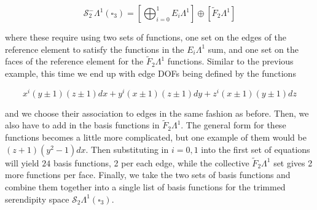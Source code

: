 \documentclass[manuscript,screen]{acmart}
\newcommand{\calS}{\mathcal{S}}
\begin{document}
\begin{equation}
   \calS^-_2\Lambda^1(\square_3) =    \left[\bigoplus_{i=0}^{1} E_i \Lambda^1\right] \oplus \left[\tilde{F}_2 \Lambda^1\right]
   \end{equation}
   
\noindent where these require using two sets of functions, one set on the edges of the reference element to satisfy the functions in the $E_i\Lambda^1$ sum, and one set on the faces of the reference element for the $\tilde{F}_2\Lambda^1$ functions. Similar to the previous example, this time we end up with edge DOFs being defined by the functions 

\begin{equation*}
    x^i(y\pm 1)(z\pm 1)dx + y^i(x\pm 1)(z\pm 1) dy + z^i(x \pm 1)(y \pm 1)dz
\end{equation*}

\noindent and we choose their association to edges in the same fashion as before.  Then, we also have to add in the basis functions in $\tilde{F}_2\Lambda^1$.  The general form for these functions becomes a little more complicated, but one example of them would be $(z+1)(y^2-1)dx$.  Then substituting in $i=0, 1$ into the first set of equations will yield $24$ basis functions, 2 per each edge, while the collective $\tilde{F}_2\Lambda^1$ set gives 2 more functions per face.  Finally, we take the two sets of basis functions and combine them together into a single list of basis functions for the trimmed serendipity space $\mathcal{S}_2\Lambda^1(\square_3)$.  

 
 
\end{document}
